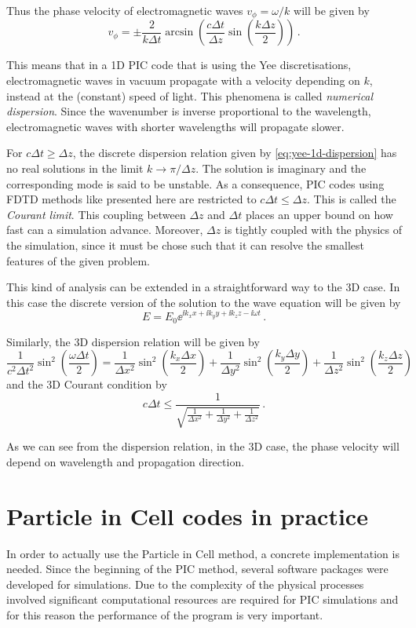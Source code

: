 \documentclass[12pt, class=report, crop=false]{standalone}
\begin{document}
Thus the phase velocity of electromagnetic waves \(v_\phi = \omega/k\) will be given by
\[
v_\phi = \pm \frac{2}{k\Delta t} \arcsin(\frac{c \Delta t}{\Delta z} \sin(\frac{k \Delta z}{2}))\,.
\]

This means that in a 1D PIC code that is using the Yee discretisations, electromagnetic
waves in vacuum propagate with a velocity depending on \(k\), instead at the
(constant) speed of light. This phenomena is called \emph{numerical dispersion}.
Since the wavenumber is inverse proportional to the wavelength, electromagnetic
waves with shorter wavelengths will propagate slower.

For \(c \Delta t \ge \Delta z\), the discrete dispersion relation given by
\cref{eq:yee-1d-dispersion} has no real solutions in the limit \(k \to \pi/\Delta z\).
The solution is imaginary and the corresponding mode is said to be unstable.
As a consequence, PIC codes using FDTD methods like presented here are restricted
to \(c \Delta t \leq \Delta z\). This is called the \emph{Courant limit}.
This coupling between \(\Delta z\) and \(\Delta t\) places an upper bound on
how fast can a simulation advance.
Moreover, \(\Delta z\) is tightly coupled with the physics of the simulation,
since it must be chose such that it can resolve the smallest features of
the given problem.

This kind of analysis can be extended in a straightforward way to the 3D case.
In this case the discrete version of the solution to the wave equation will
be given by
\[
E = E_0 \ee^{\ii k_x x + \ii k_y y + \ii k_z z - \ii \omega t}\,.
\]

Similarly, the 3D dispersion relation will be given by
\[
\frac{1}{c^2 \Delta t^2} \sin^2\left(\frac{\omega \Delta t}{2}\right) =
  \frac{1}{\Delta x^2} \sin^2\left(\frac{k_x \Delta x}{2}\right) +
  \frac{1}{\Delta y^2} \sin^2\left(\frac{k_y \Delta y}{2}\right) +
  \frac{1}{\Delta z^2} \sin^2\left(\frac{k_z \Delta z}{2}\right)
\]
and the 3D Courant condition by
\[
c \Delta t \leq \frac{1}{\sqrt{\frac{1}{\Delta x^2} + \frac{1}{\Delta y^2} + \frac{1}{\Delta z^2}}}\,.
\]

As we can see from the dispersion relation, in the 3D case, the phase velocity
will depend on wavelength and propagation direction.

\section{Particle in Cell codes in practice}

In order to actually use the Particle in Cell method, a concrete implementation
is needed. Since the beginning of the PIC method, several software packages
were developed for simulations. Due to the complexity of the physical processes
involved significant computational resources are required for PIC simulations
and for this reason the performance of the program is very important.
\end{document}
